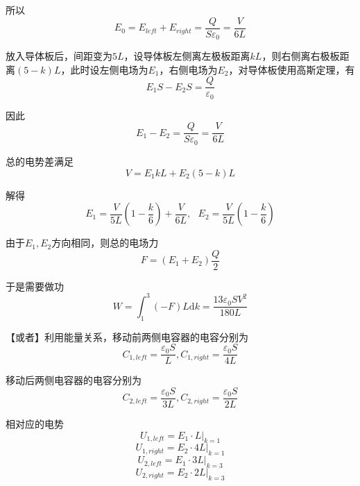 \documentclass{SCIS2020cn}
\begin{document}
所以
\begin{equation}
    E_0=E_{left}+E_{right}=\frac{Q}{S\varepsilon_0}=\frac{V}{6L}
\end{equation}

放入导体板后，间距变为$5L$，设导体板左侧离左极板距离$kL$，则右侧离右极板距离$(5-k)L$，此时设左侧电场为$E_1$，右侧电场为$E_2$，对导体板使用高斯定理，有
\begin{equation}
    E_1S-E_2S=\frac{Q}{\varepsilon_0}
\end{equation}

因此
\begin{equation}
    E_1-E_2=\frac{Q}{S\varepsilon_0}=\frac{V}{6L}
\end{equation}

总的电势差满足
\begin{equation}
    V=E_1kL+E_2(5-k)L
\end{equation}

解得
\begin{equation}
    E_1=\frac{V}{5L}\left(1-\frac{k}{6}\right)+\frac{V}{6L},\text{ }E_2=\frac{V}{5L}\left(1-\frac{k}{6}\right)
\end{equation}

由于$E_1,E_2$方向相同，则总的电场力
\begin{equation}
    F=(E_1+E_2)\frac{Q}{2}
\end{equation}

于是需要做功
\begin{equation}
    W=\int_1^3(-F)L\text{d}k=\frac{13\varepsilon_0SV^2}{180L}
\end{equation}

【或者】利用能量关系，移动前两侧电容器的电容分别为
\begin{equation}
    C_{1,left}=\frac{\varepsilon_0S}{L}, C_{1,right}=\frac{\varepsilon_0S}{4L}
\end{equation}

移动后两侧电容器的电容分别为
\begin{equation}
    C_{2,left}=\frac{\varepsilon_0S}{3L}, C_{2,right}=\frac{\varepsilon_0S}{2L}
\end{equation}

相对应的电势
\begin{equation}
    U_{1,left}=E_1·L|_{k=1}
\end{equation}
\begin{equation}
    U_{1,right}=E_2·4L|_{k=1}
\end{equation}
\begin{equation}
    U_{2,left}=E_1·3L|_{k=3}
\end{equation}
\begin{equation}
    U_{2,right}=E_2·2L|_{k=3}
\end{equation}
\end{document}
